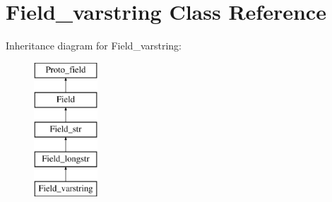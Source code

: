 \hypertarget{classField__varstring}{}\section{Field\+\_\+varstring Class Reference}
\label{classField__varstring}
Inheritance diagram for Field\+\_\+varstring\+:\begin{figure}[H]
\begin{center}
\leavevmode
\includegraphics[height=5.000000cm]{classField__varstring}
\end{center}
\end{figure}
